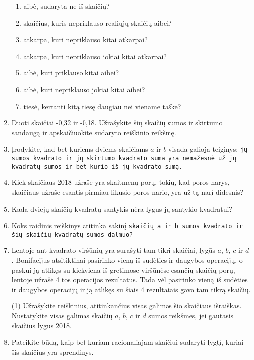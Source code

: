 \documentclass{article}
\begin{document}
\begin{enumerate}
\begin{enumerate}
\item aibė, sudaryta ne iš skaičių?
\item  skaičius, kuris nepriklauso realiųjų skaičių aibei?
\item  atkarpa, kuri nepriklauso kitai atkarpai?
\item  atkarpa, kuri nepriklauso jokiai kitai atkarpai?
\item  aibė, kuri priklauso kitai aibei?
\item  aibė, kuri nepriklauso jokiai kitai aibei?
\item  tiesė, kertanti kitą tiesę daugiau nei viename taške?
\end{enumerate}
\item Duoti skaičiai -0,32 ir -0,18. Užrašykite šių skaičių sumos ir skirtumo sandaugą ir apskaičiuokite sudaryto reiškinio reikšmę.

\item Įrodykite, kad bet kuriems dviems skaičiams $a$ ir $b$ visada galioja teiginys: \texttt{jų sumos kvadrato ir jų skirtumo kvadrato suma yra nemažesnė už jų kvadratų sumos ir bet kurio iš jų kvadrato sumą.}

\item Kiek skaičiaus 2018 užraše yra skaitmenų porų, tokių, kad poros narys, skaičiaus užraše esantis pirmiau likusio poros nario, yra už tą narį didesnis?

\item Kada dviejų skaičių kvadratų santykis nėra lygus jų santykio kvadratui?

\item Koks raidinis reiškinys atitinka sakinį \texttt{skaičių a ir b sumos kvadrato ir šių skaičių kvadratų sumos dalmuo?}

\item  Lentoje ant kvadrato viršūnių yra surašyti tam tikri skaičiai, lygūs $a$, $b$, $c$ ir $d$. Bonifacijus atsitiktinai pasirinko vieną iš sudėties ir daugybos operacijų, o paskui ją atlikęs su kiekviena iš gretimose viršūnėse esančių skaičių porų, lentoje užrašė 4 tos operacijos rezultatus. Tada vėl pasirinko vieną iš sudėties ir daugybos operacijų ir ją atlikęs su šiais 4 rezultatais gavo tam tikrą skaičių. 
\begin{tasks}(1)
\task Užrašykite reiškinius, atitinkančius visas galimas šio skaičiaus išraiškas.
\task Nustatykite visas galimas skaičių $a$, $b$, $c$ ir $d$ sumos reikšmes, jei gautasis skaičius lygus 2018.
\end{tasks}

\item Pateikite būdą, kaip bet kuriam racionaliajam skaičiui sudaryti lygtį, kuriai šis skaičius yra sprendinys.


\end{enumerate}
\end{document}
